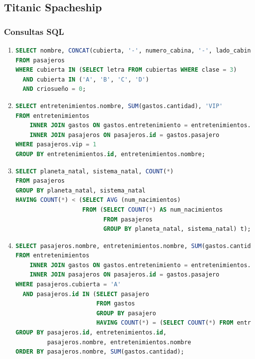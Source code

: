 \documentclass{db-practice}
\begin{document}
\subsection*{Titanic Spacheship}

\subsubsection*{Consultas SQL}

\begin{enumerate}
\item
\begin{lstlisting}[language=SQL]
SELECT nombre, CONCAT(cubierta, '-', numero_cabina, '-', lado_cabina), planeta_destino, sistema_destino
FROM pasajeros
WHERE cubierta IN (SELECT letra FROM cubiertas WHERE clase = 3)
  AND cubierta IN ('A', 'B', 'C', 'D')
  AND criosueño = 0;
\end{lstlisting}

\item
\begin{lstlisting}[language=SQL]
SELECT entretenimientos.nombre, SUM(gastos.cantidad), 'VIP'
FROM entretenimientos
    INNER JOIN gastos ON gastos.entretenimiento = entretenimientos.id
    INNER JOIN pasajeros ON pasajeros.id = gastos.pasajero
WHERE pasajeros.vip = 1
GROUP BY entretenimientos.id, entretenimientos.nombre;
\end{lstlisting}

\item
\begin{lstlisting}[language=SQL]
SELECT planeta_natal, sistema_natal, COUNT(*)
FROM pasajeros
GROUP BY planeta_natal, sistema_natal
HAVING COUNT(*) < (SELECT AVG (num_nacimientos)
                   FROM (SELECT COUNT(*) AS num_nacimientos
                         FROM pasajeros
                         GROUP BY planeta_natal, sistema_natal) t);
\end{lstlisting}

\item
\begin{lstlisting}[language=SQL]
SELECT pasajeros.nombre, entretenimientos.nombre, SUM(gastos.cantidad)
FROM entretenimientos
    INNER JOIN gastos ON gastos.entretenimiento = entretenimientos.id
    INNER JOIN pasajeros ON pasajeros.id = gastos.pasajero
WHERE pasajeros.cubierta = 'A'
  AND pasajeros.id IN (SELECT pasajero 
                       FROM gastos 
                       GROUP BY pasajero 
                       HAVING COUNT(*) = (SELECT COUNT(*) FROM entretenimientos))
GROUP BY pasajeros.id, entretenimientos.id, 
         pasajeros.nombre, entretenimientos.nombre
ORDER BY pasajeros.nombre, SUM(gastos.cantidad);
\end{lstlisting}


\end{enumerate}
\end{document}

